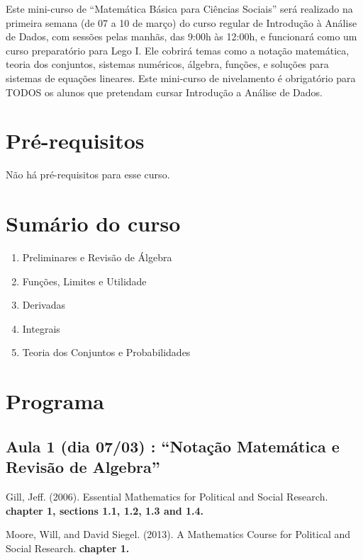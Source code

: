 \documentclass[a4paper, 12pt]{article}
\renewenvironment{itemize}{
  \begin{list}{}{
    \setlength{\leftmargin}{1.5em}
  }
}{
  \end{list}
}
\begin{document}
Este mini-curso de ``Matemática Básica para Ciências Sociais'' será realizado na primeira semana (de 07 a 10 de março) do curso regular de Introdução à Análise de Dados, com sessões pelas manhãs, das 9:00h às 12:00h, e funcionará como um curso preparatório para Lego I. Ele cobrirá temas como a notação matemática, teoria dos conjuntos,  sistemas numéricos, álgebra, funções, e soluções para sistemas de equações lineares. Este mini-curso de nivelamento é obrigatório para TODOS os alunos que pretendam cursar Introdução a Análise de Dados.

\section*{Pré-requisitos}

Não há pré-requisitos para esse curso.  


\section*{Sumário do curso}

\begin{enumerate}

\item Preliminares e Revisão de Álgebra 
\item Funções, Limites e Utilidade
\item Derivadas 
\item Integrais
\item Teoria dos Conjuntos e Probabilidades

\end{enumerate}


\vspace{1.0cm}

\section*{Programa}

\subsection*{\textbf{Aula 1} (dia 07/03) : ``Notação Matemática e Revisão de Algebra''} 
\begin{itemize}

\item Gill, Jeff. (2006). Essential Mathematics for Political and Social Research.  \textbf{chapter 1, sections 1.1, 1.2, 1.3 and 1.4.}


\item Moore, Will, and David Siegel. (2013). A Mathematics Course for Political and Social Research. \textbf{chapter 1.}

\end{itemize}
\end{document}
